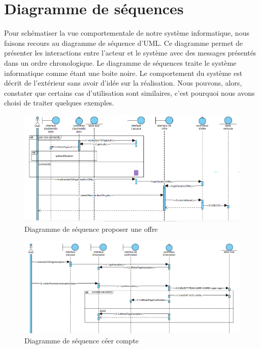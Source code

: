 \section{Diagramme de séquences}
\large{Pour schématiser la vue comportementale de notre système informatique, nous faisons recours au diagramme
de séquence d'UML. Ce diagramme permet de présenter les interactions entre l'acteur et le système avec des
messages présentés dans un ordre chronologique. Le diagramme de séquences traite le système informatique
comme étant une boite noire. Le comportement du système est décrit de l'extérieur sans avoir d'idée sur la
réalisation. Nous pouvons, alors, constater que certains cas d'utilisation sont similaires, c'est pourquoi nous
avons choisi de traiter quelques exemples.\\}

\newpage
\begin{figure}[p]

\centering
\includegraphics[width=1.3\textwidth, angle =90 ]{55.PNG}
\caption{Diagramme de séquence proposer une offre}
\label{fig:awesome_image}

\end{figure}
\newpage
\begin{figure}[p]

\centering
\includegraphics[width=1.3\textwidth, angle =90 ]{44.PNG}
\caption{Diagramme de séquence céer compte}
\label{fig:awesome_image}

\end{figure}
